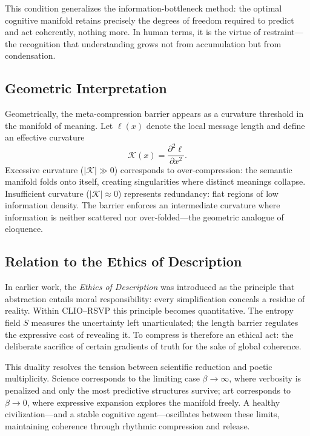\documentclass[11pt]{article}
\begin{document}
This condition generalizes the information-bottleneck method:  
the optimal cognitive manifold retains precisely the degrees of freedom required to predict and act coherently, nothing more.  
In human terms, it is the virtue of restraint—the recognition that understanding grows not from accumulation but from condensation.

\subsection{Geometric Interpretation}

Geometrically, the meta-compression barrier appears as a curvature threshold in the manifold of meaning.  
Let $\ell(x)$ denote the local message length and define an effective curvature
\[
\mathcal{K}(x) = \frac{\partial^2 \ell}{\partial x^2}.
\]
Excessive curvature ($|\mathcal{K}| \gg 0$) corresponds to over-compression: the semantic manifold folds onto itself, creating singularities where distinct meanings collapse.  
Insufficient curvature ($|\mathcal{K}| \approx 0$) represents redundancy: flat regions of low information density.  
The barrier enforces an intermediate curvature where information is neither scattered nor over-folded—the geometric analogue of eloquence.

\subsection{Relation to the Ethics of Description}

In earlier work, the \emph{Ethics of Description} was introduced as the principle that abstraction entails moral responsibility: every simplification conceals a residue of reality.  
Within CLIO–RSVP this principle becomes quantitative.  
The entropy field $S$ measures the uncertainty left unarticulated;  
the length barrier regulates the expressive cost of revealing it.  
To compress is therefore an ethical act: the deliberate sacrifice of certain gradients of truth for the sake of global coherence.

This duality resolves the tension between scientific reduction and poetic multiplicity.  
Science corresponds to the limiting case $\beta\!\to\!\infty$, where verbosity is penalized and only the most predictive structures survive;  
art corresponds to $\beta\!\to\!0$, where expressive expansion explores the manifold freely.  
A healthy civilization—and a stable cognitive agent—oscillates between these limits, maintaining coherence through rhythmic compression and release.
\end{document}
